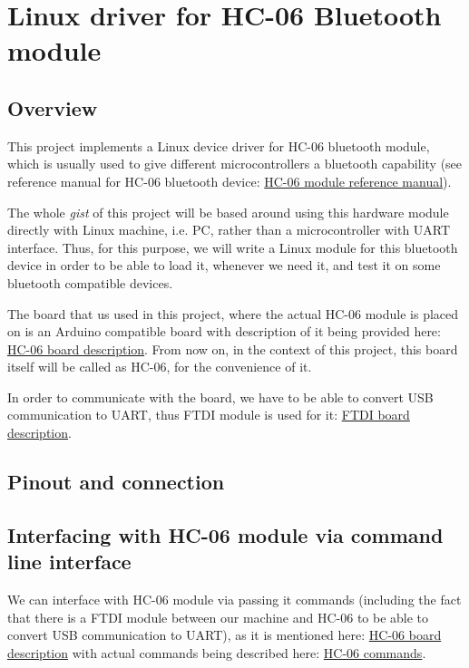 \documentclass[12pt]{book}
\newcommand{\mychapter}[1]{
    \renewcommand\chaptername{}
    \renewcommand\thechapter{}
    \chapter{#1}
    \renewcommand\thechapter{1}
}
\begin{document}
\mychapter{Linux driver for HC-06 Bluetooth module}
\section{Overview}
This project implements a Linux device driver for HC-06 bluetooth module, which is usually used to give different 
microcontrollers a bluetooth capability (see reference manual for HC-06 bluetooth device: 
\href{https://components101.com/sites/default/files/component_datasheet/HC06%20Bluetooth%20Module%20Datasheet.pdf}{
HC-06 module reference manual}).

The whole \emph{gist} of this project will be based around using this hardware module directly with Linux machine, 
i.e. PC, rather than a microcontroller with UART interface. Thus, for this purpose, we will write a Linux module
for this bluetooth device in order to be able to load it, whenever we need it, and test it on some bluetooth 
compatible devices.

The board that us used in this project, where the actual HC-06 module is placed on is an Arduino compatible board
with description of it being provided here: \href{https://components101.com/wireless/hc-06-bluetooth-module-pinout-datasheet}{
HC-06 board description}. From now on, in the context of this project, this board itself will be called as HC-06, for the 
convenience of it.

In order to communicate with the board, we have to be able to convert USB communication to UART, thus FTDI module 
is used for it: 
\href{https://www.digitec.ch/en/s1/product/deek-robot-dk-ftdi-isp-breakout-335v-power-component-electronics-modules-5997850}{
FTDI board description}.

\section{Pinout and connection}

\section{Interfacing with HC-06 module via command line interface}
We can interface with HC-06 module via passing it commands (including the fact that there is a FTDI module between our machine 
and HC-06 to be able to convert USB communication to UART), as it is mentioned here: 
\href{https://components101.com/wireless/hc-06-bluetooth-module-pinout-datasheet}{HC-06 board description} with actual commands 
being described here: \href{http://wiki.sunfounder.cc/images/7/7b/HC-06_AT_Commands_Reference.pdf}{HC-06 commands}.
\end{document}
